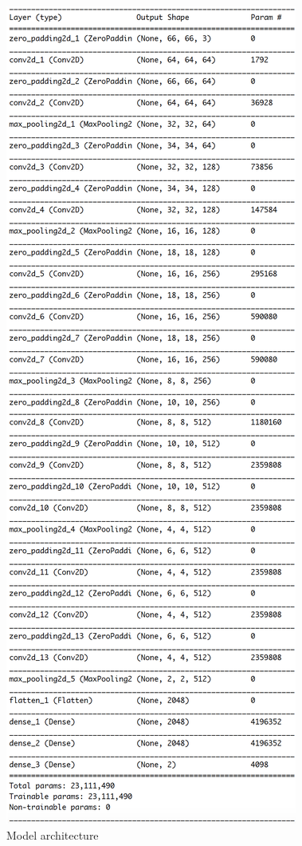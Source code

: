 \documentclass[a4paper]{article}
\begin{document}
\begin{figure}[h!]
\centering
\includegraphics[scale=0.4]{VGG_arch.png}
\caption{Model architecture}
\label{fig:vgg}
\end{figure}
\end{document}
